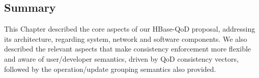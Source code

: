 \subsection*{Summary}
This Chapter described the core aspects of our HBase-QoD proposal, addressing its architecture, regarding system, network and software components. We also described the relevant aspects that make consistency enforcement more flexible and aware of user/developer semantics, driven by QoD consistency vectors, followed by the operation/update grouping semantics also provided.

